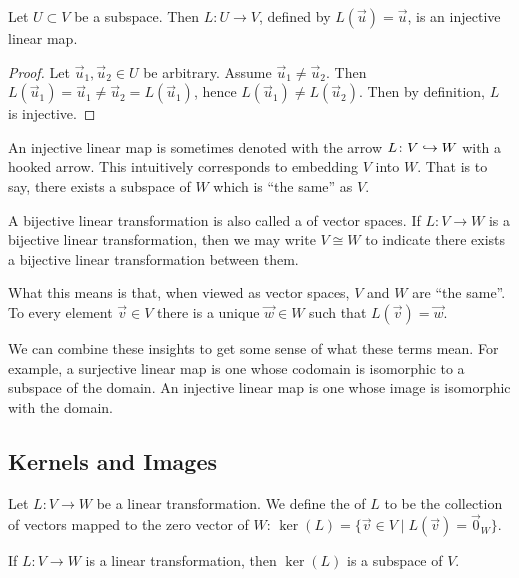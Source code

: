 \begin{example}
Let $U\subset V$ be a subspace. Then $L\colon U\to V$, defined by $L(\vec{u})=\vec{u}$,
is an injective linear map.

\begin{proof}
Let $\vec{u}_{1},\vec{u}_{2}\in U$ be arbitrary. Assume $\vec{u}_{1}\neq\vec{u}_{2}$.
Then $L(\vec{u}_{1})=\vec{u}_{1}\neq\vec{u}_{2}=L(\vec{u}_{1})$, hence
$L(\vec{u}_{1})\neq L(\vec{u}_{2})$. Then by definition, $L$ is injective.
\end{proof}
\end{example}

An injective linear map is sometimes denoted with the arrow $L\colon V\hookrightarrow W$
with a hooked arrow. This intuitively corresponds to embedding $V$ into $W$.
That is to say, there exists a subspace of $W$ which is ``the same'' as
$V$.

A bijective linear transformation is also called a 
of vector spaces. If $L\colon V\to W$ is a bijective linear
transformation, then we may write $V\cong W$ to indicate there exists a
bijective linear transformation between them.

What this means is that, when viewed as vector spaces, $V$ and $W$ are
``the same''. To every element $\vec{v}\in V$ there is a unique
$\vec{w}\in W$ such that $L(\vec{v})=\vec{w}$.

We can combine these insights to get some sense of what these terms
mean. For example, a surjective linear map is one whose codomain is
isomorphic to a subspace of the domain. An injective linear map is one
whose image is isomorphic with the domain.

\subsection{Kernels and Images}

\begin{definition}
Let $L\colon V\to W$ be a linear transformation. We define the
 of $L$ to be the collection of vectors mapped to the
zero vector of $W$: $\ker(L)=\{\vec{v}\in V\mid L(\vec{v})=\vec{0}_{W}\}$.
\end{definition}

\begin{proposition}
If $L\colon V\to W$ is a linear transformation, then $\ker(L)$ is a
subspace of $V$.
\end{proposition}

